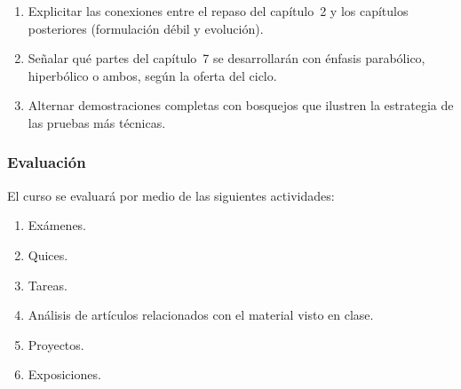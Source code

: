 \begin{refsection}
\begin{enumerate}
    \item Explicitar las conexiones entre el repaso del capítulo~2 y los capítulos posteriores (formulación débil y evolución).
    \item Señalar qué partes del capítulo~7 se desarrollarán con énfasis parabólico, hiperbólico o ambos, según la oferta del ciclo.
    \item Alternar demostraciones completas con bosquejos que ilustren la estrategia de las pruebas más técnicas.
\end{enumerate}

\subsubsection*{Evaluación}

El curso se evaluará por medio de las siguientes actividades:

\begin{enumerate}
\item Exámenes.
\item Quices.
\item Tareas.
\item Análisis de artículos relacionados con el material visto en clase.
\item Proyectos.
\item Exposiciones.
\end{enumerate}

\nocite{Bre11}
\nocite{Eva97}
\nocite{john82}
\nocite{rauch91}
\nocite{renardy04}

\printcursosbibliography

\end{refsection}
